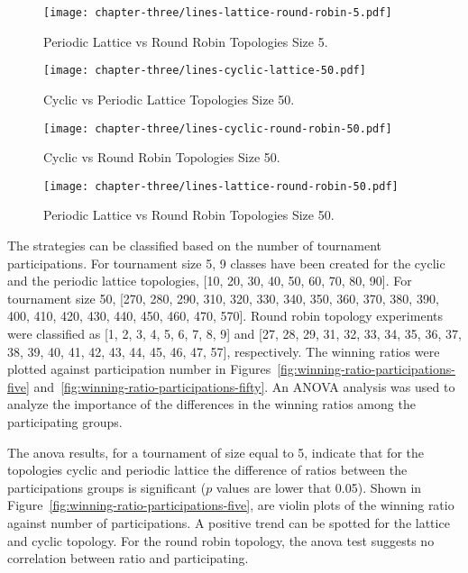 \begin{figure}[H]
\centering
    \texttt{[image: chapter-three/lines-lattice-round-robin-5.pdf]}\
\caption{Periodic Lattice vs Round
         Robin Topologies Size 5.}
\label{fig:winning-rankings-five-l-r}
\end{figure}

\begin{figure}[H]
\centering
    \texttt{[image: chapter-three/lines-cyclic-lattice-50.pdf]}
\caption{Cyclic vs Periodic Lattice Topologies Size 50.}
\label{fig:winning-rankings-fifty-c-l}
\end{figure}

\begin{figure}[H]
\centering
    \texttt{[image: chapter-three/lines-cyclic-round-robin-50.pdf]}
\caption{Cyclic vs Round Robin Topologies Size 50.}
\label{fig:winning-rankings-fifty-c-r}
\end{figure}

\begin{figure}[H]
\centering
    \texttt{[image: chapter-three/lines-lattice-round-robin-50.pdf]}
\caption{Periodic Lattice vs Round
             Robin Topologies Size 50.}
             \label{fig:winning-rankings-fifty-l-r}
\end{figure}

The strategies can be classified based on the number of tournament
participations. For tournament size 5, 9 classes have been created for
the cyclic and the periodic lattice topologies, [10, 20, 30, 40, 50, 60, 70, 80, 90].
For tournament
size 50, [270, 280, 290, 310, 320, 330, 340, 350, 360, 370, 380, 390, 400, 410,
420, 430, 440, 450, 460, 470, 570]. Round robin topology
experiments were classified as [1, 2, 3, 4, 5, 6, 7, 8, 9] and
[27, 28, 29, 31, 32, 33, 34, 35, 36, 37, 38, 39, 40, 41, 42, 43, 44, 45, 46, 47, 57],
respectively. The winning ratios were plotted against participation number
in Figures~\ref{fig:winning-ratio-participations-five} and~\ref{fig:winning-ratio-participations-fifty}.
An ANOVA analysis was used to analyze the importance of the
differences in the winning ratios among the participating groups.

The anova results, for a tournament of size equal to 5,
indicate that for the topologies cyclic and periodic lattice the difference
of ratios between the participations groups is significant (\(p\) values
are lower that 0.05). Shown in Figure~\ref{fig:winning-ratio-participations-five},
are violin plots of the winning ratio against number of participations. A positive
trend can be spotted for the lattice and cyclic topology. For the round robin
topology, the anova test suggests no correlation between ratio and participating.


